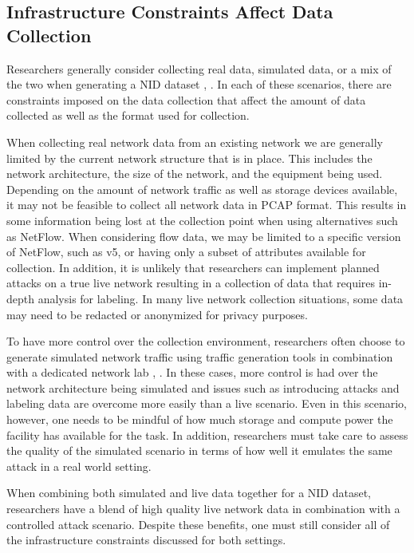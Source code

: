 \documentclass[conference]{IEEEtran}
\begin{document}
\subsection{Infrastructure Constraints Affect Data Collection}\label{subsec:infrastructure}
Researchers generally consider collecting real data, simulated data, or a mix of the two when generating a NID dataset \cite{Chou2022}, \cite{ring2019survey}. 
In each of these scenarios, there are constraints imposed on the data collection that affect the amount of data collected as well as the format used for collection.

When collecting real network data from an existing network we are generally limited by the current network structure that is in place.
This includes the network architecture, the size of the network, and the equipment being used.
Depending on the amount of network traffic as well as storage devices available, it may not be feasible to collect all network data in PCAP format.
This results in some information being lost at the collection point when using alternatives such as NetFlow.
When considering flow data, we may be limited to a specific version of NetFlow, such as v5, or having only a subset of attributes available for collection.
In addition, it is unlikely that researchers can implement planned attacks on a true live network resulting in a collection of data that requires in-depth analysis for labeling.
In many live network collection situations, some data may need to be redacted or anonymized for privacy purposes.

To have more control over the collection environment, researchers often choose to generate simulated network traffic using traffic generation tools in combination with a dedicated network lab \cite{unswnb15}, \cite{sharafaldin2018toward}.
In these cases, more control is had over the network architecture being simulated and issues such as introducing attacks and labeling data are overcome more easily than a live scenario.
Even in this scenario, however, one needs to be mindful of how much storage and compute power the facility has available for the task.
In addition, researchers must take care to assess the quality of the simulated scenario in terms of how well it emulates the same attack in a real world setting.

When combining both simulated and live data together for a NID dataset, researchers have a blend of high quality live network data in combination with a controlled attack scenario.
Despite these benefits, one must still  consider all of the infrastructure constraints discussed for both settings.
\end{document}
